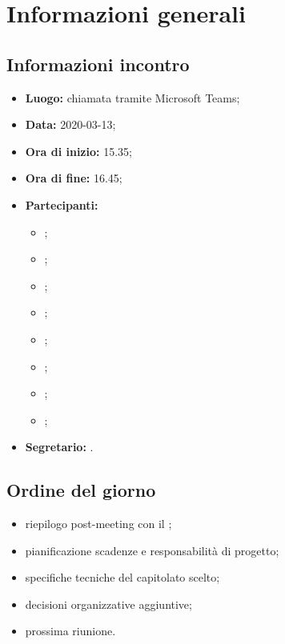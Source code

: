 \section{Informazioni generali}
\subsection{Informazioni incontro}
\begin{itemize}
	\item \textbf{Luogo:} chiamata tramite Microsoft Teams; 
	\item \textbf{Data:} 2020-03-13; 
	\item \textbf{Ora di inizio:} 15.35; 
	\item \textbf{Ora di fine:} 16.45; 
	\item \textbf{Partecipanti:}
		\begin{itemize}
			\item \VB; 
			\item \LB; 
			\item \NF; 
			\item \EG; 
			\item \FJ; 
			\item \MP; 
			\item \AS; 
			\item \AZ; 
		\end{itemize}
	\item \textbf{Segretario:} \AS. 
\end{itemize}

\subsection{Ordine del giorno}
\begin{itemize}
	\item riepilogo post-meeting con il \TV{};
	\item pianificazione scadenze e responsabilità di progetto;
	\item specifiche tecniche del capitolato scelto;
	\item decisioni organizzative aggiuntive;
	\item prossima riunione.
\end{itemize}
